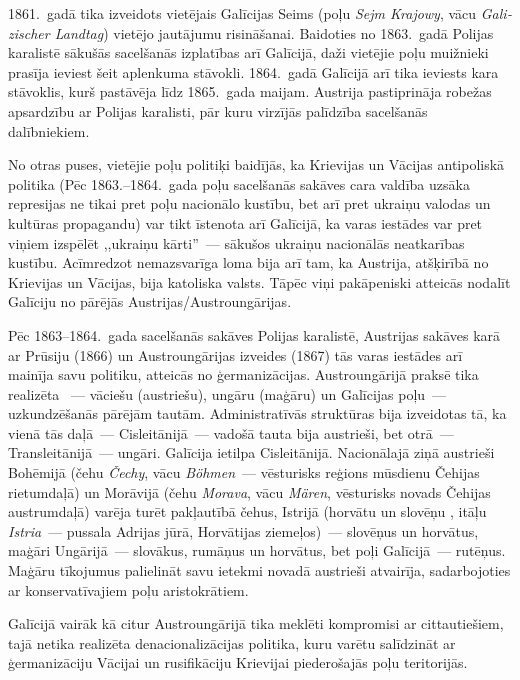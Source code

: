 \documentclass[twoside,a5paper,12pt,fleqn,openany]{extbook}
\newcommand{\pltxti}[1]{\textit{\textpolish{#1}}}
\newcommand{\detxti}[1]{\textit{\textgerman{#1}}}
\newcommand{\ittxti}[1]{\textit{\textitalian{#1}}}
\newcommand{\cstxti}[1]{\textit{\textczech{#1}}}
\newcommand{\sltxti}[1]{\textit{\textslovene{#1}}}
\begin{document}
1861.~gadā tika izveidots vietējais Galīcijas Seims (poļu \pltxti{Sejm Krajowy}, vācu \detxti{Galizischer Landtag}) vietējo jautājumu risināšanai. Baidoties no 1863.~gadā Polijas karalistē sākušās sacelšanās izplatības arī Galīcijā, daži vietējie poļu muižnieki prasīja ieviest šeit aplenkuma stāvokli. 1864.~gadā Galīcijā arī tika ieviests kara stāvoklis, kurš pastāvēja līdz 1865.~gada maijam. Austrija pastiprināja robežas apsardzību ar Polijas karalisti, pār kuru virzījās palīdzība sacelšanās dalībniekiem.

No otras puses, vietējie poļu politiķi baidījās, ka Krievijas un Vācijas antipoliskā politika (Pēc 1863.--1864.~gada poļu sacelšanās sakāves cara valdība uzsāka represijas ne tikai pret poļu nacionālo kustību, bet arī pret ukraiņu valodas un kultūras propagandu) var tikt īstenota arī Galīcijā, ka varas iestādes var pret viņiem izspēlēt ,,ukraiņu kārti''~--- sākušos ukraiņu nacionālās neatkarības kustību. Acīmredzot nemazsvarīga loma bija arī tam, ka Austrija, atšķirībā no Krievijas un Vācijas, bija katoliska valsts. Tāpēc viņi pakāpeniski atteicās nodalīt Galīciju no pārējās Austrijas/Austroungārijas.

Pēc 1863--1864.~gada sacelšanās sakāves Polijas karalistē, Austrijas sakāves karā ar Prūsiju (1866) un Austroungārijas izveides (1867) tās varas iestādes arī mainīja savu politiku, atteicās no ģermanizācijas. Austroungārijā praksē tika realizēta ~--- vāciešu (austriešu), ungāru (maģāru) un Galīcijas poļu~--- uzkundzēšanās pārējām tautām. Administratīvās struktūras bija izveidotas tā, ka vienā tās daļā~--- Cisleitānijā~--- vadošā tauta bija austrieši, bet otrā~--- Transleitānijā~--- ungāri. Galīcija ietilpa Cisleitānijā. Nacionālajā ziņā austrieši Bohēmijā (čehu \cstxti{Čechy}, vācu \detxti{Böhmen}~--- vēsturisks reģions mūsdienu Čehijas rietumdaļā) un Morāvijā (čehu \cstxti{Morava}, vācu \detxti{Mären}, vēsturisks novads Čehijas austrumdaļā) varēja turēt pakļautībā čehus, Istrijā (horvātu un slovēņu \sltxti{Istra}, itāļu \ittxti{Istria}~--- pussala Adrijas jūrā, Horvātijas ziemeļos)~--- slovēņus un horvātus, maģāri Ungārijā~--- slovākus, rumāņus un horvātus, bet poļi Galīcijā~--- rutēņus. Maģāru tīkojumus palielināt savu ietekmi novadā austrieši atvairīja, sadarbojoties ar konservatīvajiem poļu aristokrātiem.

Galīcijā vairāk kā citur Austroungārijā tika meklēti kompromisi ar cittautiešiem, tajā netika realizēta denacionalizācijas politika, kuru varētu salīdzināt ar ģermanizāciju Vācijai un rusifikāciju Krievijai piederošajās poļu teritorijās.
\end{document}
